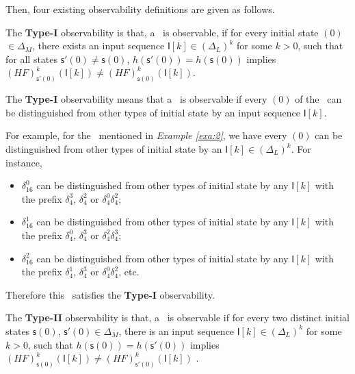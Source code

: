 Then, four existing observability definitions are given as follows.

\begin{definition} 
The {\bf Type-I} observability is that, a \BCN\ is observable, if for every initial state \State$(0)$$\in \Delta_M$, there exists an input sequence $\mathsf{I}[k]\in(\Delta_L)^k$ for some $k>0$, such that for all states $\mathsf{s}'(0)\neq \mathsf{s}(0)$, $h(\mathsf{s}'(0))=h(\mathsf{s}(0))$ implies $(HF)^k_{\mathsf{s}'(0)}(\mathsf{I}[k])\neq (HF)^k_{{\mathsf{s}(0)}}(\mathsf{I}[k])$\cite{cheng2009controllability}.
\end{definition}

The  {\bf Type-I} observability means that a \BCN\ is observable if every \State$(0)$ of the \BCN\ can be distinguished from other types of initial state by an input sequence $\mathsf{I}[k]$. %
\begin{example}
For example, for the \BCN\ mentioned in {\em Example \ref{exa:2}}, we have every \State$(0)$ can be distinguished from other types of initial state by an $\mathsf{I}[k] \in(\Delta_L)^k$.  For instance,
\begin{itemize}
  \item $\delta_{16}^0$ can be distinguished from other types of initial state by any $\mathsf{I}[k]$ with the prefix $\delta_{4}^3$, $\delta_{4}^2$ or $\delta_{4}^0  \delta_{4}^2$;%
  \item $\delta_{16}^1$ can be distinguished from other types of initial state by any $\mathsf{I}[k]$ with the prefix $\delta_{4}^0$, $\delta_{4}^3$ or $\delta_{4}^2 \delta_{4}^3$;
  \item $\delta_{16}^2$ can be distinguished from other types of initial state by any $\mathsf{I}[k]$ with the prefix $\delta_{4}^1$, $\delta_{4}^3$ or $\delta_{4}^0 \delta_{4}^2$, etc.
\end{itemize} 
Therefore this \BCN\ satisfies the  {\bf Type-I} observability.
\label{exa:4}
\end{example}   

\begin{definition}
	The  {\bf Type-II} observability is that, a \BCN\ is observable if for every two distinct initial states $\mathsf{s}(0)$, $\mathsf{s}'(0) \in \Delta_M$, there is an input sequence $\mathsf{I}[k]\in(\Delta_L)^k$ for some $k>0$, such that $h(\mathsf{s}(0))=h(\mathsf{s}'(0))$ implies $(HF)^k_{\mathsf{s}(0)}(\mathsf{I}[k])\neq (HF)^k_{\mathsf{s}'(0)}(\mathsf{I}[k])$ \cite{Zhao2010Input}.
\end{definition}

